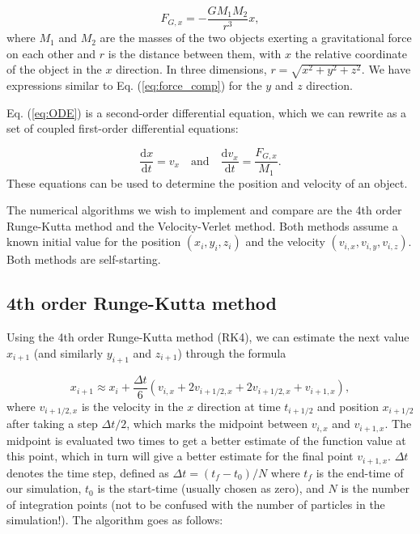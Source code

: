 \documentclass{article}
\begin{document}
\begin{multicols}{2}
\begin{equation}\label{eq:force_comp}
	F_{G,x} = - \frac{G M_1 M_2}{r^3}x,
\end{equation}
where $M_1$ and $M_2$ are the masses of the two objects exerting a gravitational force on each other and $r$ is the distance between them, with $x$ the relative coordinate of the object in the $x$ direction. In three dimensions, $r = \sqrt{x^2 + y^2 + z^2}$. We have expressions similar to Eq. (\ref{eq:force_comp}) for the $y$ and $z$ direction.

Eq. (\ref{eq:ODE}) is a second-order differential equation, which we can rewrite as a set of coupled first-order differential equations:

\begin{equation}
	\frac{\mathrm{d}x}{\mathrm{d}t} = v_x  \quad \mathrm{and} \quad \frac{\mathrm{d}v_x}{\mathrm{d}t} = \frac{F_{G,x}}{M_1}.
\end{equation}
These equations can be used to determine the position and velocity of an object.


The numerical algorithms we wish to implement and compare are the 4th order Runge-Kutta method and the Velocity-Verlet method. Both methods assume a known initial value for the position $(x_i,y_i,z_i)$ and the velocity $(v_{i,x},v_{i,y},v_{i,z})$. Both methods are self-starting. 


\subsection{4th order Runge-Kutta method}\label{sec:RK4}
Using the 4th order Runge-Kutta method (RK4), we can estimate the next value $x_{i+1}$ (and similarly $y_{i+1}$ and $z_{i+1}$) through the formula

\begin{equation}
	x_{i+1} \approx x_i + \frac{\Delta t}{6} (v_{i,x} + 2 v_{i + 1/2,x} + 2 v_{i + 1/2,x} + v_{i+1,x}),
\end{equation}
where $v_{i + 1/2,x} $ is the velocity in the $x$ direction at time $t_{i + 1/2}$ and position $x_{i + 1/2}$ after taking a step $\Delta t/2$, which marks the midpoint between $v_{i,x}$ and $v_{i+1,x}$. The midpoint is evaluated two times to get a better estimate of the function value at this point, which in turn will give a better estimate for the final point $v_{i+1,x}$. $\Delta t$ denotes the time step, defined as $\Delta t = (t_f - t_0)/N$ where $t_f$ is the end-time of our simulation, $t_0$ is the start-time (usually chosen as zero), and $N$ is the number of integration points (not to be confused with the number of particles in the simulation!). The algorithm goes as follows:


\end{multicols}
\end{document}
